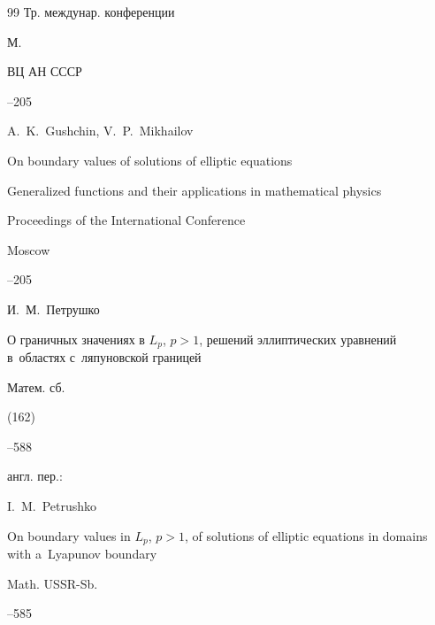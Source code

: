 \begin{thebibliography}{99}
\bookinfo Тр. междунар. конференции

\publaddr М.

\publ ВЦ АН СССР


--205

\misctransl 

\by A.~K.~Gushchin, V.~P.~Mikhailov

\paper On boundary values of solutions of elliptic equations

\inbook Generalized functions and their applications in mathematical physics

\bookinfo Proceedings of the International Conference

\publaddr Moscow


--205






\by И.~М.~Петрушко

\paper О граничных значениях в $L_p$, $p>1$, решений эллиптических уравнений в~областях с~ляпуновской границей

\jour Матем. сб.


(162)


--588




\transl англ. пер.:~

\by I.~M.~Petrushko

\paper On boundary values in $L_p$, $p>1$, of solutions of elliptic equations in domains with a~Lyapunov boundary

\jour Math. USSR-Sb.




--585








\end{thebibliography}
